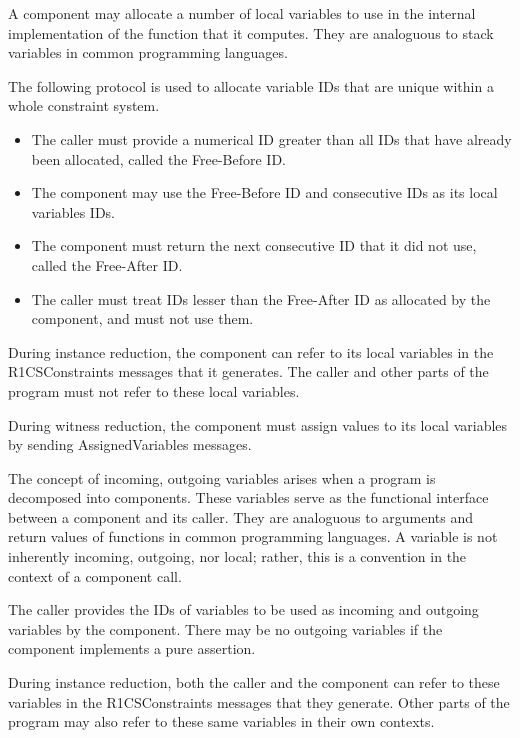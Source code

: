 
	A component may allocate a number of local variables to use
	in the internal implementation of the function that it computes.
	They are analoguous to stack variables in common programming languages.

	The following protocol is used to allocate variable IDs that are
	unique within a whole constraint system.
	\begin{itemize}
		\item The caller must provide a numerical ID greater than all IDs that have already been allocated, called the Free-Before ID.
		\item The component may use the Free-Before ID and consecutive IDs as its local variables IDs.
		\item The component must return the next consecutive ID that it did not use, called the Free-After ID.
		\item The caller must treat IDs lesser than the Free-After ID as allocated by the component,
			and must not use them.
	\end{itemize}

	During instance reduction, the component can refer to
	its local variables in the R1CSConstraints messages that it generates.
	The caller and other parts of the program must not refer to these local variables.

	During witness reduction, the component must assign values to its local variables
	by sending AssignedVariables messages.


	The concept of incoming, outgoing variables arises when a program is decomposed into components.
	These variables serve as the functional interface between a component and its caller.
	They are analoguous to arguments and return values of functions in common programming languages.
	A variable is not inherently incoming, outgoing, nor local;
	rather, this is a convention in the context of a component call.

	The caller provides the IDs of variables to be used as incoming and outgoing variables by the component.
	There may be no outgoing variables if the component implements a pure assertion.

	During instance reduction, both the caller and the component can refer to
	these variables in the R1CSConstraints messages that they generate.
	Other parts of the program may also refer to these same variables in their own contexts.

